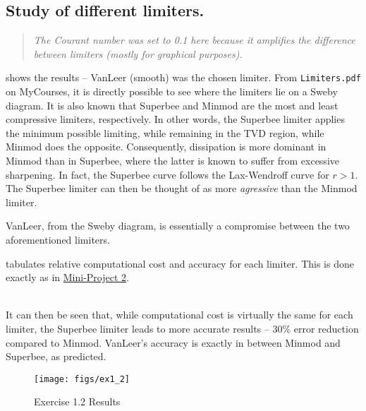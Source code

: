 \subsection{Study of different limiters.}
\begin{quote}
 \em \centering The Courant number was set to 0.1 here because it amplifies the difference between limiters (mostly for graphical purposes).
\end{quote}
 shows the results -- VanLeer (smooth) was the chosen limiter. From \texttt{Limiters.pdf} on MyCourses, it is directly possible to see where the limiters lie on a Sweby diagram. It is also known that Superbee and Minmod are the most and least compressive limiters, respectively. In other words, the Superbee limiter applies the minimum possible limiting, while remaining in the TVD region, while Minmod does the opposite. Consequently, dissipation is more dominant in Minmod than in Superbee, where the latter is known to suffer from excessive sharpening. In fact, the Superbee curve follows the Lax-Wendroff curve for $r > 1$. The Superbee limiter can then be thought of as more \emph{agressive} than the Minmod limiter.

VanLeer, from the Sweby diagram, is essentially a compromise between the two aforementioned limiters.

 tabulates relative computational cost and accuracy for each limiter. This is done exactly as in \href{https://github.com/Kreger51/mech_516/blob/master/project/docs/MECH516_Project2_260450544.pdf}{Mini-Project 2}.\\[-3mm]
\noindent\hrulefill\par
\noindent{}\\[1cm]
It can then be seen that, while computational cost is virtually the same for each limiter, the Superbee limiter leads to more accurate results -- 30\% error reduction compared to Minmod. VanLeer's accuracy is exactly in between Minmod and Superbee, as predicted.
\begin{figure}
    \centering
    \texttt{[image: figs/ex1\_2]}
    \caption{Exercise 1.2 Results}\label{fig:ex1_2}
\end{figure}

